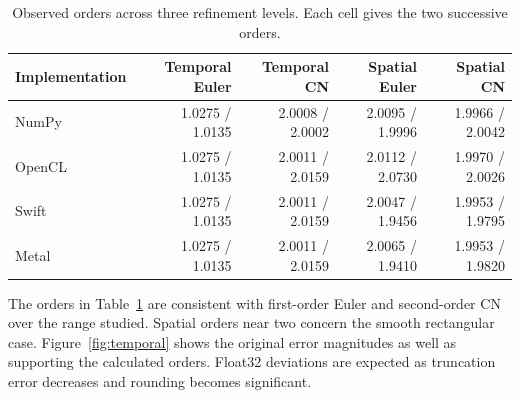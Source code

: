 \documentclass[11pt,a4paper]{article}
\begin{document}
\begin{table}[tbp]\centering\small
\caption{Observed orders across three refinement levels. Each cell gives the two successive orders.}\label{tab:orders}
\begin{tabular}{@{}lrrrr@{}}\toprule
Implementation & Temporal Euler & Temporal CN & Spatial Euler & Spatial CN\\\midrule
NumPy & 1.0275 / 1.0135 & 2.0008 / 2.0002 & 2.0095 / 1.9996 & 1.9966 / 2.0042\\
OpenCL & 1.0275 / 1.0135 & 2.0011 / 2.0159 & 2.0112 / 2.0730 & 1.9970 / 2.0026\\
Swift & 1.0275 / 1.0135 & 2.0011 / 2.0159 & 2.0047 / 1.9456 & 1.9953 / 1.9795\\
Metal & 1.0275 / 1.0135 & 2.0011 / 2.0159 & 2.0065 / 1.9410 & 1.9953 / 1.9820\\
\bottomrule\end{tabular}\end{table}

The orders in Table~\ref{tab:orders} are consistent with first-order Euler and second-order CN over the range studied. Spatial orders near two concern the smooth rectangular case. Figure~\ref{fig:temporal} shows the original error magnitudes as well as supporting the calculated orders. Float32 deviations are expected as truncation error decreases and rounding becomes significant.
\end{document}
